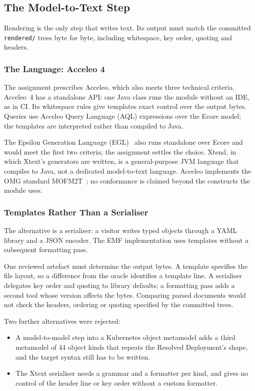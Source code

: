 \subsection{The Model-to-Text Step}
\label{sec:m2t-choices}

Rendering is the only step that writes text. Its output must match the committed
\texttt{rendered/} trees byte for byte, including whitespace, key order, quoting and headers.

\subsubsection{The Language: Acceleo 4}
\label{sec:m2t-language}

The assignment prescribes Acceleo, which also meets three technical criteria.
Acceleo~4 has a standalone API: one Java class runs the module without an IDE, as in CI.
Its whitespace rules give templates exact control over the output bytes. Queries use
Acceleo Query Language (AQL) expressions over the Ecore model; the templates
are interpreted rather than compiled to Java.

The Epsilon Generation Language (EGL)~\cite{egl} also runs standalone over Ecore
and would meet the first two criteria; the assignment settles the choice. Xtend, in which Xtext's generators are written, is a
general-purpose JVM language that compiles to Java, not a dedicated model-to-text language.
Acceleo implements the OMG standard MOFM2T~\cite{mofm2t}; no conformance is
claimed beyond the constructs the module uses.

\subsubsection{Templates Rather Than a Serialiser}
\label{sec:m2t-templates}

The alternative is a serialiser: a visitor writes typed objects through a YAML library
and a JSON encoder. The EMF implementation uses templates without a subsequent
formatting pass.

One reviewed artefact must determine the output bytes. A template specifies the
file layout, so a difference from the oracle identifies a template line.
A serialiser delegates key order and quoting to library
defaults; a formatting pass adds a second tool whose version affects the bytes.
Comparing parsed documents would not check the headers, ordering or quoting
specified by the committed trees.

Two further alternatives were rejected:
\begin{itemize}
\item A model-to-model step into a Kubernetes object metamodel adds a third
metamodel of 44 object kinds that repeats the Resolved Deployment's shape, and the
target syntax still has to be written.
\item The Xtext serialiser needs a grammar and a formatter per kind, and gives no
control of the header line or key order without a custom formatter.
\end{itemize}

